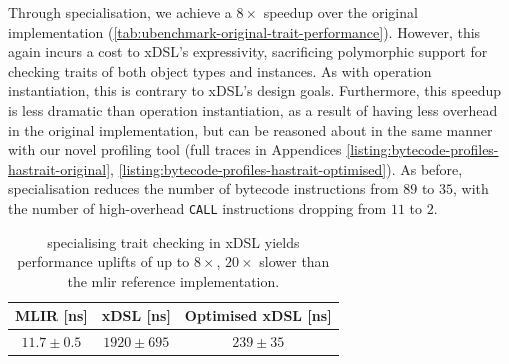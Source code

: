 Through specialisation, we achieve a $8\times$ speedup over the original implementation (\autoref{tab:ubenchmark-original-trait-performance}).
However, this again incurs a cost to xDSL's expressivity, sacrificing polymorphic support for checking traits of both object types and instances. As with operation instantiation, this is contrary to xDSL's design goals.
Furthermore, this speedup is less dramatic than operation instantiation, as a result of having less overhead in the original implementation, but can be reasoned about in the same manner with our novel profiling tool (full traces in Appendices \ref{listing:bytecode-profiles-hastrait-original}, \ref{listing:bytecode-profiles-hastrait-optimised}). As before, specialisation reduces the number of bytecode instructions from $89$ to $35$, with the number of high-overhead \texttt{CALL} instructions dropping from $11$ to $2$.


\begin{table}[H]
  \caption{specialising trait checking in xDSL yields performance uplifts of up to $8\times$, $20\times$ slower than the \ac{mlir} reference implementation.}
  \label{tab:ubenchmark-original-trait-performance}
  \centering
  \begin{tabular}{ccc}
    \toprule
    \textbf{MLIR [ns]} & \textbf{xDSL [ns]} & \textbf{Optimised xDSL [ns]} \\
    \midrule
    $11.7 \pm 0.5$ & $1920 \pm 695$ & $239 \pm 35$ \\
    \bottomrule
  \end{tabular}
\end{table}






